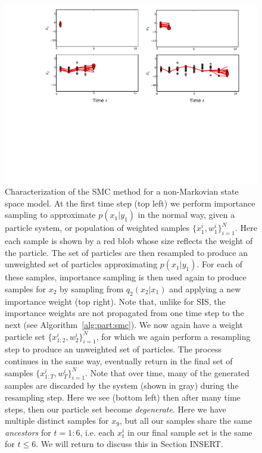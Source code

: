 \begin{figure}[t]
	\centering 
	\includegraphics[width=\textwidth]{part/figures/smc_explan}
	\caption{Characterization of the SMC method for a non-Markovian state space model.  At the first time step (top left) 
		we perform importance sampling to approximate $p(x_1 | y_1)$ in the normal way, given a particle system, or population
		of weighted samples $\{x_1^i,w_1^i\}_{i=1}^N$.  Here each sample is shown by a red blob whose size reflects the weight
		of the particle.  The set of particles are then resampled to produce an unweighted set of particles approximating
		$p(x_1 | y_1)$.  For each of these samples, importance sampling is then used again to produce samples for $x_2$
		by sampling from $q_2 (x_2 | x_1)$ and applying a new importance weight (top right).  Note that, unlike for SIS,
		the importance weights are not propagated from one time step to the next (see Algorithm~\ref{alg:part:smc}).
		We now again have a weight particle set $\{x_{1:2}^i,w_2^i\}_{i=1}^N$, for which we again perform a resampling
		step to produce an unweighted set of particles.  The process continues in the same way, eventually return in the
		final set of samples $\{x_{1:T}^i,w_T^i\}_{i=1}^N$.  Note that over time, many of the generated samples are
		discarded by the system (shown in gray) during the resampling step.  Here we see (bottom left) then after
		many time steps, then our particle set become \emph{degenerate}.  Here we have multiple distinct samples for $x_9$, but
		all our samples share the same \emph{ancestors} for $t=1:6$, i.e. each $x_t^i$ in our final sample set is
		the same for $t\le6$.  We will return to discuss this in Section INSERT.
		\label{fig:part:smc_explan}}
\end{figure}

